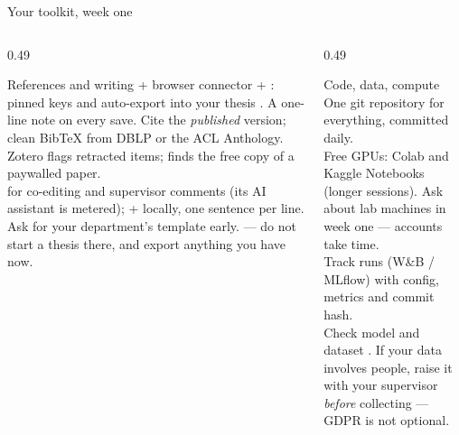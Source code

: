 \documentclass[aspectratio=169,11pt]{beamer}
\begin{document}
\begin{frame}{Your toolkit, week one}
\begin{columns}[T]
\begin{column}{0.49\textwidth}
\begin{block}{References and writing}
\footnotesize
{} + browser connector + : pinned keys and
auto-export into your thesis . A one-line note on every save.
Cite the \emph{published} version; clean BibTeX from DBLP or the ACL
Anthology. Zotero flags retracted items;  finds the free copy
of a paywalled paper.\\[4pt]
 for co-editing and supervisor comments (its AI assistant is
metered);  +  locally, one sentence per line. Ask for
your department's template early.  --- do not
start a thesis there, and export anything you have now.
\end{block}
\end{column}
\begin{column}{0.49\textwidth}
\begin{block}{Code, data, compute}
\footnotesize
One git repository for everything, committed daily.\\[3pt]
Free GPUs: Colab and Kaggle Notebooks (longer sessions). Ask about lab machines
in week one --- accounts take time.\\[3pt]
Track runs (W\&B / MLflow) with config, metrics and commit hash.\\[3pt]
Check model and dataset . If your data involves people, raise it
with your supervisor \emph{before} collecting --- GDPR is not optional.
\end{block}
\end{column}
\end{columns}
\end{frame}
\end{document}
